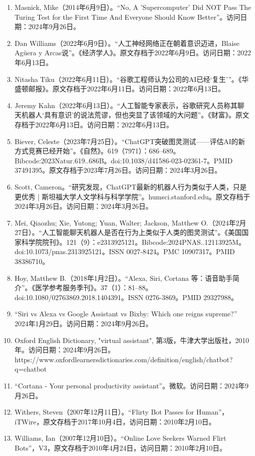 \begin{enumerate}
\item Masnick, Mike（2014年6月9日）。“No, A 'Supercomputer' Did NOT Pass The Turing Test for the First Time And Everyone Should Know Better”。访问日期：2024年9月26日。
\item Dan Williams（2022年6月9日）。“人工神经网络正在朝着意识迈进，Blaise Agüera y Arcas说”。《经济学人》。原文存档于2022年6月9日。访问日期：2022年6月13日。
\item Nitasha Tiku（2022年6月11日）。“谷歌工程师认为公司的AI已经‘复生’”。《华盛顿邮报》。原文存档于2022年6月11日。访问日期：2022年6月13日。
\item Jeremy Kahn（2022年6月13日）。“人工智能专家表示，谷歌研究人员称其聊天机器人‘具有意识’的说法荒谬，但也突显了该领域的大问题”。《财富》。原文存档于2022年6月13日。访问日期：2022年6月13日。
\item Biever, Celeste（2023年7月25日）。“ChatGPT突破图灵测试——评估AI的新方式竞赛已经开始”。《自然》。619（7971）：686–689。Bibcode:2023Natur.619..686B。doi:10.1038/d41586-023-02361-7。PMID 37491395。原文存档于2023年7月26日。访问日期：2024年3月26日。
\item Scott, Cameron。“研究发现，ChatGPT最新的机器人行为类似于人类，只是更优秀 | 斯坦福大学人文学科与科学学院”。humsci.stanford.edu。原文存档于2024年3月26日。访问日期：2024年3月26日。
\item Mei, Qiaozhu; Xie, Yutong; Yuan, Walter; Jackson, Matthew O.（2024年2月27日）。“人工智能聊天机器人是否在行为上类似于人类的图灵测试”。《美国国家科学院院刊》。121（9）：e2313925121。Bibcode:2024PNAS..12113925M。doi:10.1073/pnas.2313925121。ISSN 0027-8424。PMC 10907317。PMID 38386710。
\item Hoy, Matthew B.（2018年1月2日）。“Alexa, Siri, Cortana 等：语音助手简介”。《医学参考服务季刊》。37（1）：81–88。doi:10.1080/02763869.2018.1404391。ISSN 0276-3869。PMID 29327988。
\item “Siri vs Alexa vs Google Assistant vs Bixby: Which one reigns supreme?” 2024年1月29日。访问日期：2024年9月26日。
\item Oxford English Dictionary, "virtual assistant", 第3版，牛津大学出版社，2010年。访问日期：2024年9月26日。https://www.oxfordlearnersdictionaries.com/definition/english/chatbot?q=chatbot
\item “Cortana - Your personal productivity assistant”。微软。访问日期：2024年9月26日。
\item Withers, Steven（2007年12月11日）。“Flirty Bot Passes for Human”，iTWire，原文存档于2017年10月4日，访问日期：2010年2月10日。
\item Williams, Ian（2007年12月10日）。“Online Love Seekers Warned Flirt Bots”，V3，原文存档于2010年4月24日，访问日期：2010年2月10日。

\end{enumerate}
